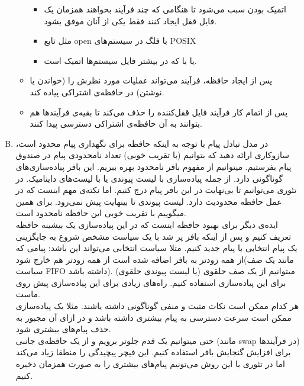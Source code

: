 \documentclass[]{article}
\begin{document}
\begin{enumerate}[(A)]
\begin{itemize}
\begin{itemize}
                              \item اتمیک بودن سبب می‌شود تا هنگامی که چند فرآیند بخواهند همزمان یک فایل قفل ایجاد کنند فقط یکی از آنان موفق بشود.
                              \item مثل تابع open با فلگ
                                     در سیستم‌های POSIX
                              \item یا با   که در بیشتر فایل سیستم‌ها اتمیک است.
                        \end{itemize}
                  \item پس از ایجاد حافظه، فرآیند می‌تواند عملیات مورد نظرش را (خواندن یا نوشتن) در حافظه‌ی اشتراکی پیاده‌ کند.
                  \item پس از اتمام کار فرآیند فایل قفل‌کننده را حذف می‌کند تا بقیه‌ی فرآیند‌ها هم بتوانند به آن حافظه‌ی اشتراکی دسترسی پیدا کنند.
            \end{itemize}

      \item {ﺩﺭ ﻣﺪﻝ ﺗﺒﺎﺩﻝ ﭘﯿﺎﻡ ﺑﺎ ﺗﻮﺟﻪ ﺑﻪ ﺍﯾﻨﮑﻪ ﺣﺎﻓﻈﻪ ﺑﺮﺍﯼ ﻧﮕﻬﺪﺍﺭﯼ ﭘﯿﺎﻡ ﻣﺤﺪﻭﺩ ﺍﺳﺖ، ﺳﺎﺯﻭﮐﺎﺭﯼ ﺍﺭﺍﺋﻪ ﺩﻫﯿﺪ ﮐﻪ ﺑﺘﻮﺍﻧﯿﻢ
            (با تقریب خوبی)
            ﺗﻌﺪﺍﺩ ﻧﺎﻣﺤﺪﻭﺩﯼ ﭘﯿﺎﻡ ﺩﺭ ﺻﻨﺪﻭﻕ ﭘﯿﺎﻡ ﺑﻔﺮﺳﺘﯿﻢ.}
            میتوانیم از مفهوم بافر نامحدود بهره ببریم. این بافر پیاده‌سازی‌های گوناگونی دارد.
            از جمله پیاده‌سازی با لیست پیوندی یا با لیست‌های داینامیک. در تئوری می‌توانیم تا بی‌نهایت در این بافر پیام درج کنیم. اما نکته‌ی مهم اینست که در عمل حافظه‌ محدودیت دارد.
            لیست پیوندی تا بینهایت پیش نمی‌رود. برای همین میگوییم با تقریب خوبی این حافظه نامحدود است.
            \\
            ایده‌ی دیگر برای بهبود حافظه اینست که در این پیاده‌سازی یک بیشینه حافظه تعریف کنیم و پس از اینکه بافر پر شد با یک سیاست مشخص شروع به جایگزینی یک پیام انتخابی با پیام جدید کنیم.
            مثلا سیاست انتخابی می‌تواند این باشد: پیامی که از همه زودتر به بافر اضافه شده است از همه زودتر هم خارج شود(مانند یک صف سیاست FIFO داشته باشد).
            میتوانیم از یک صف حلقوی (یا لیست پیوندی حلقوی) برای این پیاده‌سازی استفاده کنیم.
            راه‌های زیادی برای این پیاده‌سازی پیش روی ماست.
            \\
            هر کدام ممکن است نکات مثبت و منفی گوناگونی داشته یاشند. مثلا یک پیاده‌سازی ممکن است سرعت دسترسی به پیام بیشتری داشته باشد و در ازای آن مجبور به حذف پیام‌های بیشتری شود.
            \\
            حتی میتوانیم یک قدم جلوتر برویم و از یک حافظه‌ی جانبی (مانند swap در فرآیند‌ها) برای افزایش گنجایش بافر استفاده کنیم.
            این فیچر پیچیدگی را منطقا زیاد می‌کند اما در تئوری با این روش می‌تونیم پیام‌های بیشتری را به صورت همزمان ذخیره کنیم.


\end{enumerate}
\end{document}
